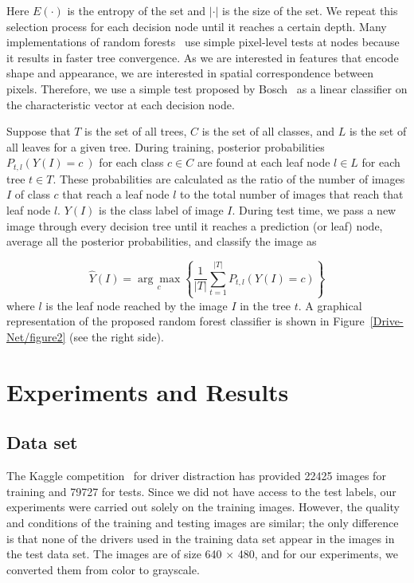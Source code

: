 \documentclass[conference,compsoc]{IEEEtran}
\begin{document}
Here $E(\cdot) $ is the entropy of the set and $\left\vert \cdot\right\vert $ is the size of the set. We repeat this selection process for each decision node until it reaches a certain depth. Many implementations of random forests~\cite{lepetit_Keypoint_2006,winn_Object_2006} use simple pixel-level tests at nodes because it results in faster tree convergence. As we are interested in features that encode shape and appearance, we are interested in spatial correspondence between pixels. Therefore, we use a simple test proposed by Bosch~\cite{bosch_Image_2007} {\textemdash} as a linear classifier on the characteristic vector {\textemdash} at each decision node.

Suppose that $T $ is the set of all trees, $C $ is the set of all classes, and $L $ is the set of all leaves for a given tree. During training, posterior probabilities $P_{t,l}\left(Y\left(I\right)=c\:\right) $ for each class $c\in C $ are found at each leaf node $l\in L $ for each tree $t\in T $. These probabilities are calculated as the ratio of the number of images $I $ of class $c $ that reach a leaf node $l $ to the total number of images that reach that leaf node $l $. $Y\left(I\right) $ is the class label of image $I $. During test time, we pass a new image through every decision tree until it reaches a prediction (or leaf) node, average all the posterior probabilities, and classify the image as


\begin{equation}
\label{eq:disp-formula-group-032e1395024b44bca0feeb46474c0adc}
\widehat Y(I) = \underset c {\arg \max} \left\{\frac{1}{\left\vert T\right\vert}\sum_{t=1}^{\left\vert T\right\vert} P_{t,l} (Y(I) = c) \right\}
\end{equation}
where $l $ is the leaf node reached by the image $I $ in the tree $t $. A graphical representation of the proposed random forest classifier is shown in Figure~\ref{Drive-Net/figure2}  (see the right side).

\section{Experiments and Results}
\subsection{Data set}
The Kaggle competition~\cite{montoya_State_2016} for driver distraction has provided 22425 images for training and 79727 for tests. Since we did not have access to the test labels, our experiments were carried out solely on the training images. However, the quality and conditions of the training and testing images are similar; the only difference is that none of the drivers used in the training data set appear in the images in the test data set. The images are of size 640 \ensuremath{\times} 480, and for our experiments, we converted them from color to grayscale.
\end{document}
